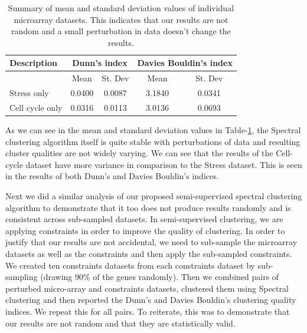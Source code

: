 \begin{table}[p]
\centering
\begin{tabular}{|l|c|c|c|c|}
\hline
Description & \multicolumn{2}{|c|}{Dunn's index}  & \multicolumn{2}{|c|}{Davies Bouldin's index}\\
\hline
 & Mean & St. Dev & Mean & St. Dev\\
\hline
Stress only  & 0.0400 & 0.0087 & 3.1840 & 0.0341 \\
Cell cycle only & 0.0316 & 0.0113 & 3.0136 & 0.0693 \\
\hline 
\end{tabular}
\caption[Summary of mean and standard deviation values of individual microarray datasets.]{Summary of mean and standard deviation values of individual microarray datasets. 
This indicates that our results are not random and a small perturbation in data doesn't change the results.}
\label{tab:stress_ccycle_perturb}
\end{table}

As we can see in the mean and standard deviation values in Table-\ref{tab:stress_ccycle_perturb}, the Spectral clustering algorithm itself is quite stable with perturbations of 
data and resulting cluster qualities are not widely varying. We can see that the results of the Cell-cycle dataset have more variance in comparison to the Stress dataset. 
This is seen in the results of both Dunn's and Davies Bouldin's indices.

Next we did a similar analysis of our proposed semi-supervised spectral clustering algorithm to demonstrate that it too does not produce results randomly and is consistent across 
sub-sampled datasets. In semi-supervised clustering, we are applying constraints in order to improve the quality 
of clustering. In order to justify that our results are not accidental, we need to sub-sample the microarray datasets as well as the constraints and then apply the 
sub-sampled constraints. We created ten constraints datasets from each constraints dataset by sub-sampling (drawing 90\% of the genes randomly). Then we combined pairs of 
perturbed micro-array and constraints datasets, clustered them using Spectral clustering and then reported the Dunn's and Davies Bouldin's clustering quality indices. 
We repeat this for all pairs. To reiterate, this was to demonstrate that our results are not random and that they are statistically valid.

